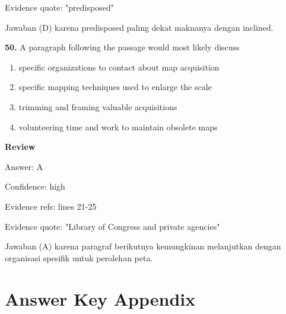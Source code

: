 \documentclass[12pt]{article}
\begin{document}
Evidence quote: "predisposed"\par
Jawaban (D) karena predisposed paling dekat maknanya dengan inclined.\par
\endgroup
\par
\vspace{0.25\baselineskip}
\noindent\textbf{50.} A paragraph following the passage would most likely discuss
\begin{enumerate}[label=(\Alph*),leftmargin=*,itemsep=0.2em]
\item specific organizations to contact about map acquisition
\item specific mapping techniques used to enlarge the scale
\item trimming and framing valuable acquisitions
\item volunteering time and work to maintain obsolete maps
\end{enumerate}
\par
\begingroup
\setlength{\parskip}{0pt}
\setlength{\parindent}{0pt}
\textbf{Review}\par
Answer: A\par
Confidence: high\par
Evidence refs: lines 21-25\par
Evidence quote: "Library of Congress and private agencies"\par
Jawaban (A) karena paragraf berikutnya kemungkinan melanjutkan dengan organisasi spesifik untuk perolehan peta.\par
\endgroup
\par
\vspace{0.25\baselineskip}
\newpage
\section*{Answer Key Appendix}
\end{document}
